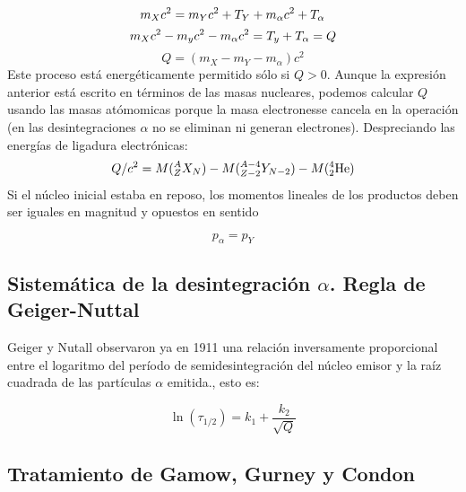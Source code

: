 \begin{equation}
    m_X c^2 = m_Y c^2 + T_Y + m_\alpha c^2 + T_\alpha \\
\end{equation}    
\begin{equation}
    m_X c^2 - m_y c^2 - m_\alpha  c^2  = T_y + T_\alpha = Q \\
\end{equation}    
\begin{equation}
    Q = (m_X - m_Y - m_\alpha)c^2
\end{equation}    
Este proceso está energéticamente permitido sólo si $Q>0$. Aunque la expresión anterior está escrito en términos de las masas nucleares, podemos calcular $Q$ usando las masas atómomicas porque la masa electronesse cancela en la operación (en las desintegraciones $\alpha$ no se eliminan ni generan electrones). Despreciando las energías de ligadura electrónicas:
\begin{eqnarray}
Q/c^2 = M(^A_Z X_N) - M(^{A-4}_{Z-2}Y_{N-2}) - M(^4_2\text{He})
\end{eqnarray}
Si el núcleo inicial estaba en reposo, los momentos lineales de los productos deben ser iguales en magnitud y opuestos en sentido

\begin{equation}
    p_\alpha = p_Y
\end{equation}

\subsection{Sistemática de la desintegración $\alpha$. Regla de Geiger-Nuttal}

Geiger y Nutall observaron ya en 1911 una relación inversamente proporcional entre el logaritmo del período de semidesintegración del núcleo emisor y la raíz cuadrada de las partículas $\alpha$ emitida., esto es:

\begin{equation}
\ln (\tau_{1/2}) = k_1 + \frac{k_2}{\sqrt{Q}}
\end{equation}

\subsection{Tratamiento de Gamow, Gurney y Condon}


